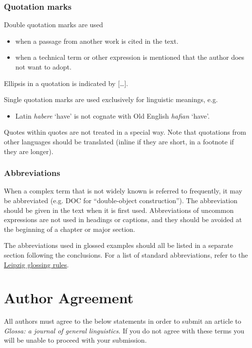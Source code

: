 \documentclass[charis,linguex]{glossa}
\begin{document}
\subsubsection{Quotation marks}
Double quotation marks are used

\begin{itemize}
\item when a passage from another work is cited in the text.
\item when a technical term or other expression is mentioned that the author does not want to adopt.
\end{itemize}
Ellipsis in a quotation is indicated by [\ldots].

Single quotation marks are used exclusively for linguistic meanings, e.g.
\begin{itemize}
\item Latin \textit{habere} ‘have’ is not cognate with Old English \textit{hafian} ‘have’.
\end{itemize}
Quotes within quotes are not treated in a special way.
Note that quotations from other languages should be translated (inline if they are short, in a footnote if they are longer).

\subsubsection{Abbreviations}
When a complex term that is not widely known is referred to frequently, it may be abbreviated (e.g. DOC for ``double-object construction''). The abbreviation should be given in the text when it is first used. Abbreviations of uncommon expressions are not used in headings or captions, and they should be avoided at the beginning of a chapter or major section.

The abbreviations used in glossed examples should all be listed in a separate section following the conclusions. For a list of standard abbreviations, refer to the \href{https://www.eva.mpg.de/lingua/resources/glossing-rules.php}{Leipzig glossing rules}.

\section{Author Agreement}

All authors must agree to the below statements in order to submit an article to \emph{Glossa: a journal of general linguistics}. If you do not agree with these terms you will be unable to proceed with your submission.
\end{document}
